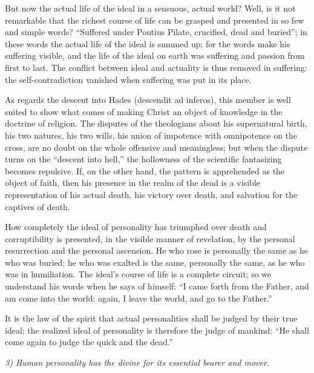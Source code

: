 \documentclass[12pt]{book}
\newcommand{\opage}[1]{\marginnote{\footnotesize\textit{[#1]}}}
\begin{document}
But now the actual life of the ideal in a sensuous, actual world? Well,
is it not remarkable that the richest course of life can be grasped and
presented in so few and simple words? ``Suffered under Pontius Pilate,
crucified, dead and buried''; in these words the actual life of the
ideal is summed up; for the words make his suffering visible, and the
life of the ideal on earth was suffering and passion from first to
last. The conflict between ideal and actuality is thus removed in
suffering: the self-contradiction vanished when suffering was put in its
place.

\opage{151}\setcounter{footnote}{0}%
As regards the descent into Hades (descendit ad inferos), this member is
well suited to show what comes of making Christ an object of knowledge
in the doctrine of religion. The disputes of the theologians about his
supernatural birth, his two natures, his two wills, his union of
impotence with omnipotence on the cross, are no doubt on the whole
offensive and meaningless; but when the dispute turns on the ``descent
into hell,'' the hollowness of the scientific fantasizing becomes
repulsive. If, on the other hand, the pattern is apprehended as the
object of faith, then his presence in the realm of the dead is a
visible representation of his actual death, his victory over death, and
salvation for the captives of death.

How completely the ideal of personality has triumphed over death and
corruptibility is presented, in the visible manner of revelation, by the
personal resurrection and the personal ascension. He who rose is
personally the same as he who was buried; he who was exalted is the
same, personally the same, as he who was in humiliation. The ideal's
course of life is a complete circuit; so we understand his words when he
says of himself: ``I came forth from the Father, and am come into the
world: again, I leave the world, and go to the Father.''

It is the law of the spirit that actual personalities shall be judged by
their true ideal; the realized ideal of personality is therefore the
judge of mankind: ``He shall come again to judge the quick and the
dead.''

\textit{3) Human personality has the divine for its essential bearer
and mover.}
\end{document}
